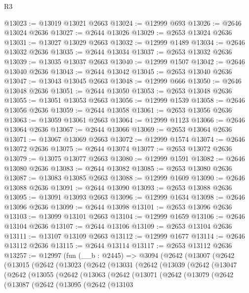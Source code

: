 \begin{lexlean}{R3}
\begin{coremodule}
@13023 := @13019 @13021 @2663
@13024 := @12999 @693
@13026 := @2646 @13024 @2636
@13027 := @2644 @13026
@13029 := @2653 @13024 @2636
@13031 := @13027 @13029 @2663
@13032 := @12999 @1489
@13034 := @2646 @13032 @2636
@13035 := @2644 @13034
@13037 := @2653 @13032 @2636
@13039 := @13035 @13037 @2663
@13040 := @12999 @1507
@13042 := @2646 @13040 @2636
@13043 := @2644 @13042
@13045 := @2653 @13040 @2636
@13047 := @13043 @13045 @2663
@13048 := @12999 @666
@13050 := @2646 @13048 @2636
@13051 := @2644 @13050
@13053 := @2653 @13048 @2636
@13055 := @13051 @13053 @2663
@13056 := @12999 @1539
@13058 := @2646 @13056 @2636
@13059 := @2644 @13058
@13061 := @2653 @13056 @2636
@13063 := @13059 @13061 @2663
@13064 := @12999 @1123
@13066 := @2646 @13064 @2636
@13067 := @2644 @13066
@13069 := @2653 @13064 @2636
@13071 := @13067 @13069 @2663
@13072 := @12999 @1574
@13074 := @2646 @13072 @2636
@13075 := @2644 @13074
@13077 := @2653 @13072 @2636
@13079 := @13075 @13077 @2663
@13080 := @12999 @1591
@13082 := @2646 @13080 @2636
@13083 := @2644 @13082
@13085 := @2653 @13080 @2636
@13087 := @13083 @13085 @2663
@13088 := @12999 @1609
@13090 := @2646 @13088 @2636
@13091 := @2644 @13090
@13093 := @2653 @13088 @2636
@13095 := @13091 @13093 @2663
@13096 := @12999 @1634
@13098 := @2646 @13096 @2636
@13099 := @2644 @13098
@13101 := @2653 @13096 @2636
@13103 := @13099 @13101 @2663
@13104 := @12999 @1659
@13106 := @2646 @13104 @2636
@13107 := @2644 @13106
@13109 := @2653 @13104 @2636
@13111 := @13107 @13109 @2663
@13112 := @12999 @1677
@13114 := @2646 @13112 @2636
@13115 := @2644 @13114
@13117 := @2653 @13112 @2636
@13257 := @12997
    (fun (__b : @2445) =>
    @3094
      (@2642
        (@13007
          (@2642
            (@13015
              (@2642
                (@13023
                  (@2642
                    (@13031
                      (@2642
                        (@13039
                          (@2642
                            (@13047
                              (@2642
                                (@13055
                                  (@2642
                                    (@13063
                                      (@2642
                                        (@13071
                                          (@2642
                                            (@13079
                                              (@2642
                                                (@13087
                                                  (@2642
                                                    (@13095
                                                      (@2642
                                                        (@13103

\end{coremodule}
\end{lexlean}

